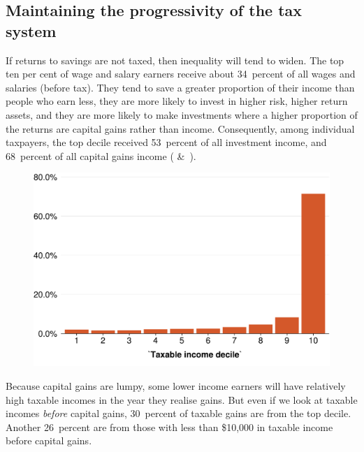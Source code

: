 \documentclass{grattan}\usepackage[]{graphicx}\usepackage[]{color}
\begin{document}
\subsection{Maintaining the progressivity of the tax system}\label{sec:maintaining-progressivity-tax-system}


If returns to savings are not taxed, then inequality will tend to widen. The top ten per cent of wage and salary earners receive about 34~percent of all wages and salaries (before tax). They tend to save a greater proportion of their income than people who earn less, they are more likely to invest in higher risk, higher return assets, and they are more likely to make investments where a higher proportion of the returns are capital gains rather than income.  Consequently, among individual taxpayers, the top decile received 53~percent of all investment income, and 68~percent of all capital gains income ( \&\ ). 

\begin{figure}

\includegraphics[width=\columnwidth]{CGT-NG-atlas//CG-by-decile-1}
\end{figure}



Because capital gains are lumpy, some lower income earners will have relatively high taxable incomes in the year they realise gains. But even if we look at taxable incomes \emph{before} capital gains, 30~percent of taxable gains are from the top decile. Another 26~percent are from those with less than \$10,000 in taxable income before capital gains.
\end{document}
